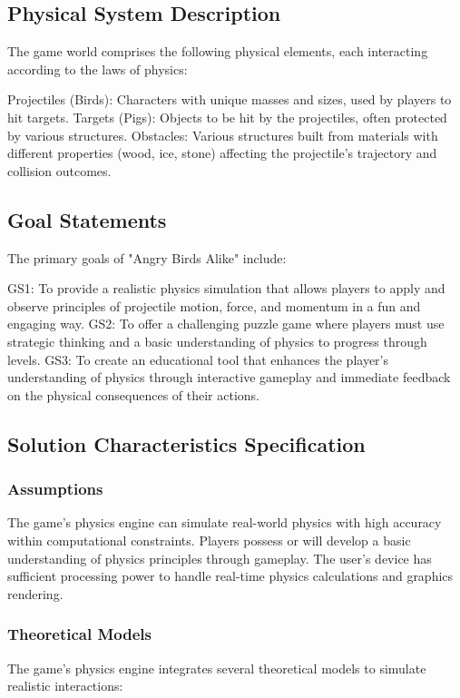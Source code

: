 \documentclass[12pt]{article}
\begin{document}
\subsection{Physical System Description}
The game world comprises the following physical elements, each interacting according to the laws of physics:

Projectiles (Birds): Characters with unique masses and sizes, used by players to hit targets.
Targets (Pigs): Objects to be hit by the projectiles, often protected by various structures.
Obstacles: Various structures built from materials with different properties (wood, ice, stone) affecting the projectile's trajectory and collision outcomes.
\subsection{Goal Statements}
The primary goals of "Angry Birds Alike" include:

GS1: To provide a realistic physics simulation that allows players to apply and observe principles of projectile motion, force, and momentum in a fun and engaging way.
GS2: To offer a challenging puzzle game where players must use strategic thinking and a basic understanding of physics to progress through levels.
GS3: To create an educational tool that enhances the player's understanding of physics through interactive gameplay and immediate feedback on the physical consequences of their actions.
\subsection{Solution Characteristics Specification}

\subsubsection{Assumptions}

The game's physics engine can simulate real-world physics with high accuracy within computational constraints.
Players possess or will develop a basic understanding of physics principles through gameplay.
The user's device has sufficient processing power to handle real-time physics calculations and graphics rendering.
\subsubsection{Theoretical Models}
The game's physics engine integrates several theoretical models to simulate realistic interactions:
\end{document}
